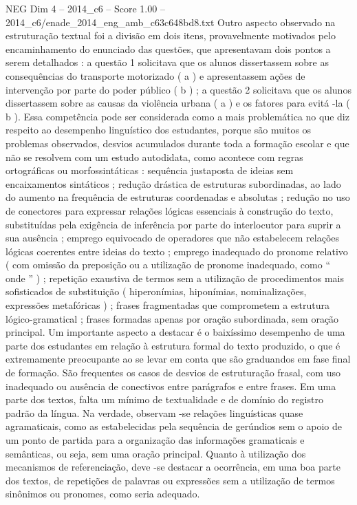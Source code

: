 \begin{textsample}{NEG Dim 4 – 2014\_c6 – Score 1.00 – 2014\_c6/enade\_2014\_eng\_amb\_c63c648bd8.txt}
Outro aspecto observado na estruturação textual foi a divisão em dois itens, provavelmente motivados pelo encaminhamento do enunciado das questões, que apresentavam dois pontos a serem detalhados : a questão 1 solicitava que os alunos dissertassem sobre as consequências do transporte motorizado ( a ) e apresentassem ações de intervenção por parte do poder público ( b ) ; a questão 2 solicitava que os alunos dissertassem sobre as causas da violência urbana ( a ) e os fatores para evitá -la ( b ).
Essa competência pode ser considerada como a mais problemática no que diz respeito ao desempenho linguístico dos estudantes, porque são muitos os problemas observados, desvios acumulados durante toda a formação escolar e que não se resolvem com um estudo autodidata, como acontece com regras ortográficas ou morfossintáticas : sequência justaposta de ideias sem encaixamentos sintáticos ; redução drástica de estruturas subordinadas, ao lado do aumento na frequência de estruturas coordenadas e absolutas ; redução no uso de conectores para expressar relações lógicas essenciais à construção do texto, substituídas pela exigência de inferência por parte do interlocutor para suprir a sua ausência ; emprego equivocado de operadores que não estabelecem relações lógicas coerentes entre ideias do texto ; emprego inadequado do pronome relativo ( com omissão da preposição ou a utilização de pronome inadequado, como “ onde ” ) ; repetição exaustiva de termos sem a utilização de procedimentos mais sofisticados de substituição ( hiperonímias, hiponímias, nominalizações, expressões metafóricas ) ; frases fragmentadas que comprometem a estrutura lógico-gramatical ; frases formadas apenas por oração subordinada, sem oração principal.
Um importante aspecto a destacar é o baixíssimo desempenho de uma parte dos estudantes em relação à estrutura formal do texto produzido, o que é extremamente preocupante ao se levar em conta que são graduandos em fase final de formação.
São frequentes os casos de desvios de estruturação frasal, com uso inadequado ou ausência de conectivos entre parágrafos e entre frases.
Em uma parte dos textos, falta um mínimo de textualidade e de domínio do registro padrão da língua.
Na verdade, observam -se relações linguísticas quase agramaticais, como as estabelecidas pela sequência de gerúndios sem o apoio de um ponto de partida para a organização das informações gramaticais e semânticas, ou seja, sem uma oração principal.
Quanto à utilização dos mecanismos de referenciação, deve -se destacar a ocorrência, em uma boa parte dos textos, de repetições de palavras ou expressões sem a utilização de termos sinônimos ou pronomes, como seria adequado.

\end{textsample}
